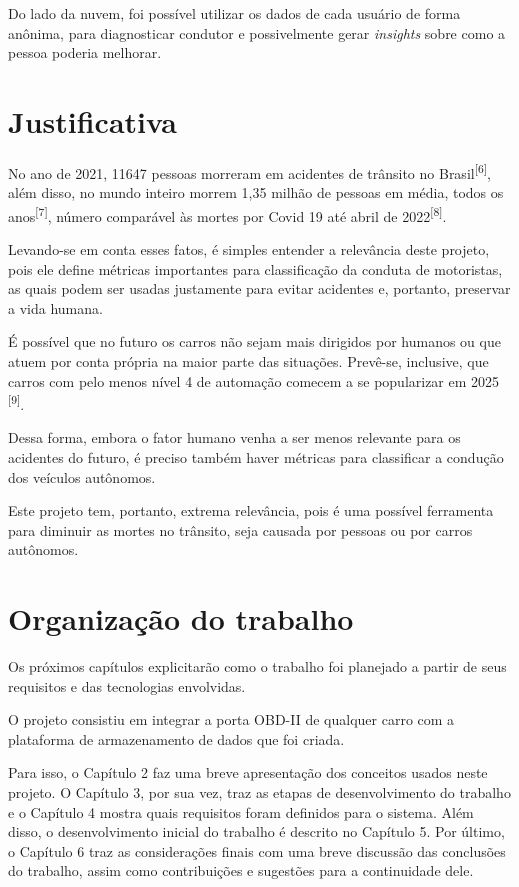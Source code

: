 Do lado da nuvem, foi possível utilizar os dados de cada usuário de forma anônima, para diagnosticar condutor e possivelmente gerar \textit{insights} sobre como a pessoa poderia melhorar.

 
\section{Justificativa}
No ano de 2021, 11647 pessoas morreram em acidentes de trânsito no Brasil\textsuperscript{[6]}, além disso, no mundo inteiro morrem 1,35 milhão de pessoas em média, todos os anos\textsuperscript{[7]}, número comparável às mortes por Covid 19 até abril de 2022\textsuperscript{[8]}.

Levando-se em conta esses fatos, é simples entender a relevância deste projeto, pois ele define métricas importantes para classificação da conduta de motoristas, as quais podem ser usadas justamente para evitar acidentes e, portanto, preservar a vida humana.

É possível que no futuro os carros não sejam mais dirigidos por humanos ou que atuem por conta própria na maior parte das situações. Prevê-se, inclusive, que carros com pelo menos nível 4 de automação comecem a se popularizar em 2025 \textsuperscript{[9]}.

Dessa forma, embora o fator humano venha a ser menos relevante para os acidentes do futuro, é preciso também haver métricas para classificar a condução dos veículos autônomos.

Este projeto tem, portanto, extrema relevância, pois é uma possível ferramenta para diminuir as mortes no trânsito, seja causada por pessoas ou por carros autônomos.

\section{Organização do trabalho}
Os próximos capítulos explicitarão como o trabalho foi planejado a partir de seus requisitos e das tecnologias envolvidas.

O projeto consistiu em integrar a porta OBD-II de qualquer carro com a plataforma de armazenamento de dados que foi criada.

Para isso, o Capítulo 2 faz uma breve apresentação dos conceitos usados neste projeto. O Capítulo 3, por sua vez, traz as etapas de desenvolvimento do trabalho e o Capítulo 4 mostra quais requisitos foram definidos para o sistema. Além disso, o desenvolvimento inicial do trabalho é descrito no Capítulo 5. Por último, o Capítulo 6 traz as considerações finais com uma breve discussão das conclusões do trabalho, assim como contribuições e sugestões para a continuidade dele.